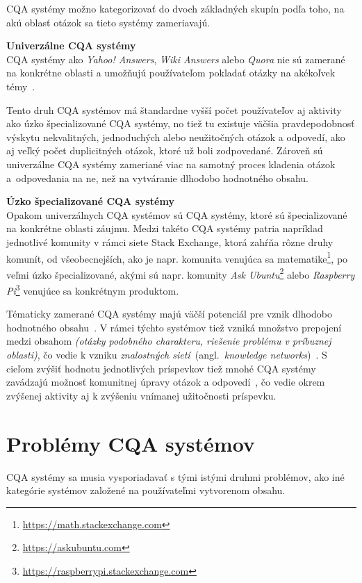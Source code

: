 CQA systémy možno kategorizovať do dvoch základných skupín podľa toho, na akú oblasť otázok sa tieto systémy zameriavajú.

\textbf{Univerzálne CQA systémy}\\
CQA systémy ako \emph{Yahoo! Answers}, \emph{Wiki Answers} alebo \emph{Quora} nie sú zamerané na konkrétne oblasti
a umožňujú používateľom pokladať otázky na akékoľvek témy~\cite{Chua2014}.

Tento druh CQA systémov má štandardne vyšší počet používateľov aj aktivity ako úzko špecializované CQA systémy,
no tiež tu existuje väčšia pravdepodobnosť výskytu nekvalitných, jednoduchých alebo neužitočných otázok a odpovedí,
ako aj veľký počet duplicitných otázok, ktoré už boli zodpovedané. Zároveň sú univerzálne CQA systémy zameriané viac
na samotný proces kladenia otázok a~odpovedania na ne, než na vytváranie dlhodobo hodnotného obsahu.

\textbf{Úzko špecializované CQA systémy}\\
Opakom univerzálnych CQA systémov sú CQA systémy, ktoré sú špecializované na konkrétne oblasti záujmu.
Medzi takéto CQA systémy patria napríklad jednotlivé komunity v rámci siete Stack Exchange, ktorá zahŕňa rôzne druhy
komunít, od všeobecnejších, ako je napr. komunita venujúca sa matematike\footnote{\url{https://math.stackexchange.com}},
po veľmi úzko špecializované, akými sú napr. komunity \emph{Ask Ubuntu}\footnote{\url{https://askubuntu.com}} alebo
\emph{Raspberry Pi}\footnote{\url{https://raspberrypi.stackexchange.com}} venujúce sa konkrétnym produktom.

Tématicky zamerané CQA systémy majú väčší potenciál pre vznik dlhodobo hodnotného obsahu~\cite{Anderson2012}. V rámci
týchto systémov tiež vzniká množstvo prepojení medzi obsahom \textit{(otázky podobného charakteru, riešenie problému
v príbuznej oblasti)}, čo vedie k vzniku \emph{znalostných sietí}~(angl.~\emph{knowledge networks})~\cite{Li2016}.
S cieľom zvýšiť hodnotu jednotlivých príspevkov tiež mnohé CQA systémy zavádzajú možnosť komunitnej úpravy
otázok a odpovedí~\cite{Li2015}, čo vedie okrem zvýšenej aktivity aj k zvýšeniu vnímanej užitočnosti príspevku.


\section{Problémy CQA systémov}

CQA systémy sa musia vysporiadavať s tými istými druhmi problémov, ako iné kategórie systémov založené na používateľmi
vytvorenom obsahu.

